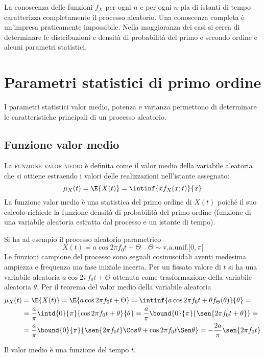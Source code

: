La conoscenza delle funzioni $f_X$ per ogni $n$ e per ogni $n$-pla di istanti di tempo caratterizza completamente il processo aleatorio. Una conoscenza completa è un'impresa praticamente impossibile. Nella maggioranza dei casi si cerca di determinare le distribuzioni e densità di probabilità del primo e secondo ordine e alcuni parametri statistici.

\section{Parametri statistici di primo ordine}
I parametri statistici valor medio, potenza e varianza permettono di determinare le caratteristiche principali di un processo aleatorio.

\subsection{Funzione valor medio}
La \textsc{funzione valor medio} è definita come il valor medio della variabile aleatoria che si ottiene estraendo i valori delle realizzazioni nell'istante assegnato:
\begin{equation}
\label{eq:proc_valor_medio}
	\mu_X(t)=\E{X(t)}=\intinf{x f_X(x;t)}{x}
\end{equation}
La funzione valor medio è una statistica del primo ordine di $X(t)$ poiché il suo calcolo richiede la funzione densità di probabilità del primo ordine (funzione di una variabile aleatoria estratta dal processo e un istante di tempo).

\begin{esempio}
Si ha ad esempio il processo aleatorio parametrico
\[
	X(t)=a\cos{2\pi f_0 t+\Theta}\quad\Theta\sim\text{v.a.unif.} [0,\pi[
\]
Le funzioni campione del processo sono segnali cosinusoidali aventi medesima ampiezza e frequenza ma fase iniziale incerta. Per un fissato valore di $t$ si ha una variabile aleatoria $a\cos{2\pi f_0 t+\Theta}$ ottenuta come trasformazione della variabile aleatoria $\theta$.
Per il teorema del valor medio della variabile aleatoria
\begin{equation}
\label{eq:esempio_processo_non_stazionario_valor_medio}
	\begin{split}\mu_X(t)&=\E{X(t)}=\E{a\cos{2\pi f_0 t+\Theta}}=\intinf{ a\cos{2\pi f_0 t+\theta}f_\Theta(\theta)}{\theta}=\\
	&=\frac{a}{\pi}\intd{0}{\pi}{\cos{2\pi f_0 t+\theta}}{\theta}=\frac{a}{\pi}\bound{0}{\pi}{\sen{2\pi f_0 t+\theta}}=\\
	&=\frac{a}{\pi}\bound{0}{\pi}{\sen{2\pi f_0 t}\Cos\theta+\cos{2\pi f_0 t}\Sen\theta}=-\frac{2a}{\pi}\sen{2\pi f_0 t}
\end{split}
\end{equation}

Il valor medio è una funzione del tempo $t$.
\end{esempio}

